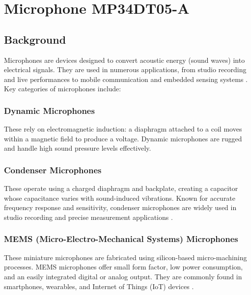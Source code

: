 %
%

%


\chapter{Microphone MP34DT05-A}\label{MicrophoneMP34DT05}

\section{Background}

\bigskip
Microphones are devices designed to convert acoustic energy (sound waves) into electrical signals. They are used in numerous applications, from studio recording and live performances to mobile communication and embedded sensing systems \cite{Eargle:2012}. Key categories of microphones include:

\subsection{Dynamic Microphones}

\bigskip
These rely on electromagnetic induction: a diaphragm attached to a coil moves within a magnetic field to produce a voltage. Dynamic microphones are rugged and handle high sound pressure levels effectively.

\subsection{Condenser Microphones}

\bigskip
These operate using a charged diaphragm and backplate, creating a capacitor whose capacitance varies with sound-induced vibrations. Known for accurate frequency response and sensitivity, condenser microphones are widely used in studio recording and precise measurement applications \cite{Ballou:2015}.

\subsection{MEMS (Micro-Electro-Mechanical Systems) Microphones}

\bigskip
These miniature microphones are fabricated using silicon-based micro-machining processes. MEMS microphones offer small form factor, low power consumption, and an easily integrated digital or analog output. They are commonly found in smartphones, wearables, and Internet of Things (IoT) devices \cite{STMicroelectronics:2021b}.

